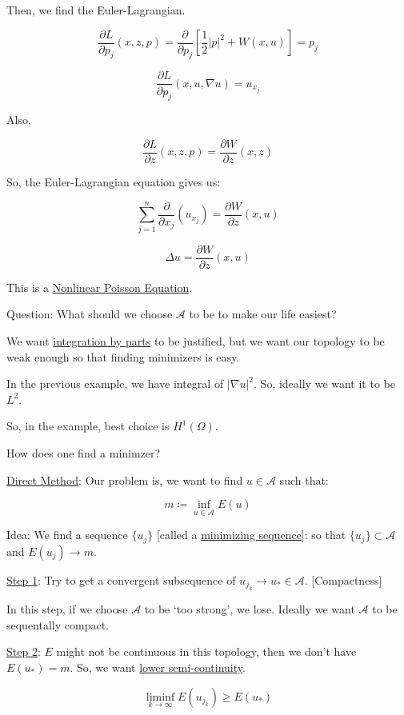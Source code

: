 \documentclass{article}
\theoremstyle{definition}
\begin{document}
Then, we find the Euler-Lagrangian.

\[
    \frac{\partial L}{\partial p_j} (x,z,p) = \frac{\partial}{\partial p_j} \left[ \frac{1}{2}\vert p \vert ^2 + W(x,u) \right] = p_j
\]

\[
    \frac{\partial L}{\partial p_j} (x, u, \nabla u) = u_{x_j}
\]

Also,

\[
    \frac{\partial L}{\partial z} (x,z,p) = \frac{\partial W}{\partial z} (x,z)
\]

So, the Euler-Lagrangian equation gives us:

\[
    \sum_{j=1}^{n} \frac{\partial}{\partial x_j} (u_{x_j}) = \frac{\partial W}{\partial z} (x,u)
\]

\[
    \Delta u = \frac{\partial W}{\partial z} (x,u)
\]

This is a \underline{Nonlinear Poisson Equation}.

Question: What should we choose \(\mathscr{A}\) to be to make our life easiest?

We want \underline{integration by parts} to be justified, but we want our topology to be weak enough so that finding minimizers is easy.

In the previous example, we have integral of \(\vert \nabla u \vert ^2\). So, ideally we want it to be \(L^2\).

So, in the example, best choice is \(H^1(\Omega)\).

How does one find a minimzer?

\underline{Direct Method}: Our problem is, we want to find \(u \in \mathscr{A}\) such that:

\[
    m \coloneqq \inf_{u\in \mathscr{A}} E(u)
\]

Idea: We find a sequence \(\{ u_j \}\) [called a \underline{minimizing sequence}]: so that \(\{ u_j \} \subset \mathscr{A}\) and \(E(u_j) \to m\).

\underline{Step 1}: Try to get a convergent subsequence of \(u_{j_k} \to u_\ast \in \mathscr{A}\). [Compactness]

In this step, if we choose \(\mathscr{A}\) to be `too strong', we lose. Ideally we want \(\mathscr{A}\) to be sequentally compact.

\underline{Step 2}: \(E\) might not be continuous in this topology, then we don't have \(E(u_\ast)=m\). So, we want \underline{lower semi-continuity}.

\[
    \liminf_{k \to \infty} E(u_{j_k}) \geq E(u_\ast)
\]
\end{document}
